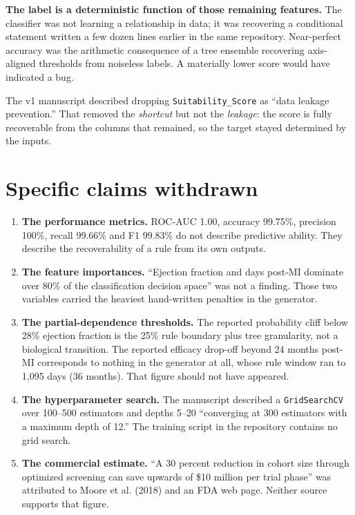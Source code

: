 \documentclass[11pt,letterpaper]{article}
\begin{document}
\textbf{The label is a deterministic function of those remaining features.} The classifier was not
learning a relationship in data; it was recovering a conditional statement written a few dozen lines
earlier in the same repository. Near-perfect accuracy was the arithmetic consequence of a tree
ensemble recovering axis-aligned thresholds from noiseless labels. A materially lower score would
have indicated a bug.

The v1 manuscript described dropping \texttt{Suitability\_Score} as ``data leakage prevention.'' That
removed the \emph{shortcut} but not the \emph{leakage}: the score is fully recoverable from the
columns that remained, so the target stayed determined by the inputs.

\section{Specific claims withdrawn}

\begin{enumerate}[leftmargin=*, itemsep=5pt]
  \item \textbf{The performance metrics.} ROC-AUC 1.00, accuracy 99.75\%, precision 100\%, recall
  99.66\% and F1 99.83\% do not describe predictive ability. They describe the recoverability of a
  rule from its own outputs.

  \item \textbf{The feature importances.} ``Ejection fraction and days post-MI dominate over 80\% of
  the classification decision space'' was not a finding. Those two variables carried the heaviest
  hand-written penalties in the generator.

  \item \textbf{The partial-dependence thresholds.} The reported probability cliff below 28\%
  ejection fraction is the 25\% rule boundary plus tree granularity, not a biological transition. The
  reported efficacy drop-off beyond 24 months post-MI corresponds to nothing in the generator at
  all, whose rule window ran to 1{,}095 days (36 months). That figure should not have appeared.

  \item \textbf{The hyperparameter search.} The manuscript described a \texttt{GridSearchCV} over
  100--500 estimators and depths 5--20 ``converging at 300 estimators with a maximum depth of 12.''
  The training script in the repository contains no grid search.

  \item \textbf{The commercial estimate.} ``A 30 percent reduction in cohort size through optimized
  screening can save upwards of \$10 million per trial phase'' was attributed to Moore et al. (2018)
  and an FDA web page. Neither source supports that figure.
\end{enumerate}
\end{document}
